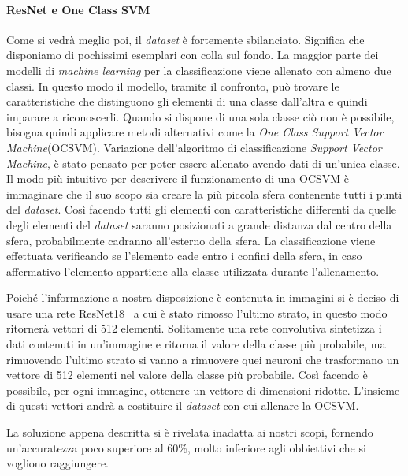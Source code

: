\paragraph{ResNet e One Class SVM} 
Come si vedrà meglio poi, il \textit{dataset} è fortemente sbilanciato.
Significa che disponiamo di pochissimi esemplari con colla sul fondo.
La maggior parte dei modelli di \textit{machine learning} per la classificazione viene allenato con almeno due classi.
In questo modo il modello, tramite il confronto, può trovare le caratteristiche che distinguono gli elementi di una classe dall'altra e quindi imparare a riconoscerli.
Quando si dispone di una sola classe ciò non è possibile, bisogna quindi applicare metodi alternativi come la \textit{One Class Support Vector Machine}(OCSVM).
Variazione dell'algoritmo di classificazione \textit{Support Vector Machine}, è stato pensato per poter essere allenato avendo dati di un'unica classe.
Il modo più intuitivo per descrivere il funzionamento di una OCSVM è immaginare che il suo scopo sia creare la più piccola sfera contenente tutti i punti del \textit{dataset}.
Così facendo tutti gli elementi con caratteristiche differenti da quelle degli elementi del \textit{dataset} saranno posizionati a grande distanza dal centro della sfera, probabilmente cadranno all'esterno della sfera.
La classificazione viene effettuata verificando se l'elemento cade entro i confini della sfera, in caso affermativo l'elemento appartiene alla classe utilizzata durante l'allenamento.

Poiché l'informazione a nostra disposizione è contenuta in immagini si è deciso di usare una rete ResNet18~\cite{resnet} a cui è stato rimosso l'ultimo strato, in questo modo ritornerà vettori di 512 elementi.
Solitamente una rete convolutiva sintetizza i dati contenuti in un'immagine e ritorna il valore della classe più probabile, ma rimuovendo l'ultimo strato si vanno a rimuovere quei neuroni che trasformano un vettore di 512 elementi nel valore della classe più probabile. %
Così facendo è possibile, per ogni immagine, ottenere un vettore di dimensioni ridotte.
L'insieme di questi vettori andrà a costituire il \textit{dataset} con cui allenare la OCSVM.

La soluzione appena descritta si è rivelata inadatta ai nostri scopi, fornendo un'accuratezza poco superiore al 60\%, molto inferiore agli obbiettivi che si vogliono raggiungere.

